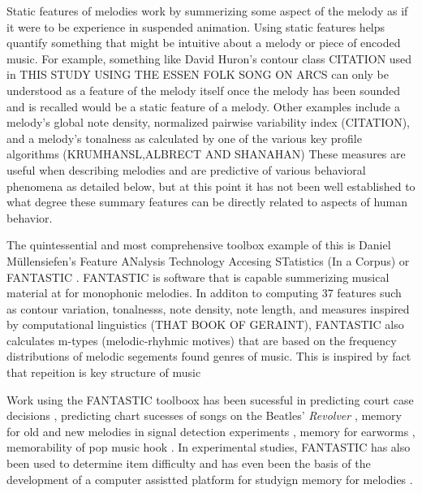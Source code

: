 \documentclass[]{book}
\theoremstyle{definition}
\theoremstyle{definition}
\theoremstyle{definition}
\theoremstyle{remark}
\begin{document}
Static features of melodies work by summerizing some aspect of the
melody as if it were to be experience in suspended animation. Using
static features helps quantify something that might be intuitive about a
melody or piece of encoded music. For example, something like David
Huron's contour class CITATION used in THIS STUDY USING THE ESSEN FOLK
SONG ON ARCS can only be understood as a feature of the melody itself
once the melody has been sounded and is recalled would be a static
feature of a melody. Other examples include a melody's global note
density, normalized pairwise variability index (CITATION), and a
melody's tonalness as calculated by one of the various key profile
algorithms (KRUMHANSL,ALBRECT AND SHANAHAN) These measures are useful
when describing melodies and are predictive of various behavioral
phenomena as detailed below, but at this point it has not been well
established to what degree these summary features can be directly
related to aspects of human behavior.

The quintessential and most comprehensive toolbox example of this is
Daniel Müllensiefen's Feature ANalysis Technology Accesing STatistics
(In a Corpus) or FANTASTIC
\citep{mullensiefenFantasticFeatureANalysis2009}. FANTASTIC is software
that is capable summerizing musical material at for monophonic melodies.
In additon to computing 37 features such as contour variation,
tonalnesss, note density, note length, and measures inspired by
computational linguistics (THAT BOOK OF GERAINT), FANTASTIC also
calculates m-types (melodic-rhyhmic motives) that are based on the
frequency distributions of melodic segements found genres of music. This
is inspired by fact that repeition is key structure of music
\citep{huronSweetAnticipation2006}

Work using the FANTASTIC toolboox has been sucessful in predicting court
case decisions \citep{mullensiefenCourtDecisionsMusic2009}, predicting
chart sucesses of songs on the Beatles' \emph{Revolver}
\citep{kopiezAufSucheNach2011}, memory for old and new melodies in
signal detection experiments
\citep{mullensiefenRoleFeaturesContext2014}, memory for earworms
\citep{jakubowskiDissectingEarwormMelodic2017, williamsonEarwormsThreeAngles2012},
memorability of pop music hook \citep{balenCorpusAnalyisTools2015}. In
experimental studies, FANTASTIC has also been used to determine item
difficulty
\citep{bakerPerceptionLeitmotivesRichard2017, harrisonModellingMelodicDiscrimination2016}
and has even been the basis of the development of a computer assistted
platform for studyign memory for melodies
\citep{rainsfordMUSOSMUsicSOftware2018}.
\end{document}
